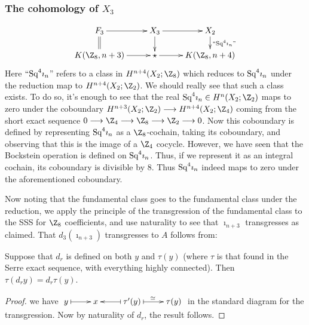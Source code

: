 \documentclass[11pt]{article}
\begin{document}
{\subsubsection{\texorpdfstring{The cohomology of $X_3$}{The cohomology of X3}}
\[\xymatrix@R=5mm{
F_3\ar[r]\ar@{=}[d]&
X_3\ar[d]\ar[r]&
X_{2}\ar[d]^{\text{``$\Squ^4\imath_n$''}}\\
K(\Z_8,n+3)\ar[r]&\star\ar[r]&K(\Z_8,n+4)
}\]
Here $``\textup{Sq}^4\imath_n$'' refers to a class in $H^{n+4}(X_2;\Z_8)$ which reduces
to $\textup{Sq}^4\imath_n$ under the reduction map to $H^{n+4}(X_2;\Z_2)$. We should
really see that such a class exists. To do so, it's enough to see that the real
$\Squ^4\imath_n\in H^n(X_2;\Z_2)$ maps to zero under the coboundary
$H^{n+3}(X_2;\Z_2)\to H^{n+4}(X_2;\Z_4)$ coming from the short exact sequence
$0\to \Z_4\to\Z_8\to\Z_2\to0$. Now this coboundary is defined by representing
$\textup{Sq}^4\imath_n$ as a $\Z_8$-cochain, taking its coboundary, and observing that
this is the image of a $\Z_4$ cocycle. However, we have seen that the \THIRD
Bockstein operation is defined on $\textup{Sq}^4\imath_n$. Thus, if we represent it as
an integral cochain, its coboundary is divisible by 8. Thus $\textup{Sq}^4\imath_n$
indeed maps to zero under the aforementioned coboundary.

Now noting that the fundamental class goes to the fundamental class under the
reduction, we apply the principle of the transgression of the fundamental class
to the SSS for $\Z_8$ coefficients, and use naturality to see that
$\imath_{n+3}$ transgresses as claimed. That $d_3(\imath_{n+3})$ transgresses to
$A$ follows from:
\begin{lem*}
Suppose that $d_r$ is defined on both $y$ and $\tau(y)$ (where $\tau$ is that
found in the Serre exact sequence, with everything highly connected). Then
$\tau(d_ry)=d_r\tau(y)$.
\end{lem*}
\begin{proof}
we have 
$\xymatrix{y\ar@{|->}[r]&x&\tau'(y)\ar@{|->}[r]^\simeq\ar@{|->}[l]&\tau(y)}$
in the standard diagram for the transgression. Now by naturality of $d_r$, the
result follows.

\end{proof}


}
\end{document}
